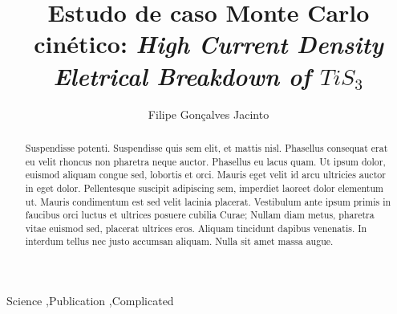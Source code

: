 \documentclass[12pt]{elsarticle}
\begin{document}
\begin{frontmatter}



    \title{Estudo de caso Monte Carlo cinético: \textit{High Current Density Eletrical Breakdown of $TiS_3$}}


\author{Filipe Gonçalves Jacinto}

\address{Vitória, Espírito Santo}

\begin{abstract}
Suspendisse potenti. Suspendisse quis sem elit, et mattis nisl. Phasellus consequat erat eu velit rhoncus non pharetra neque auctor. Phasellus eu lacus quam. Ut ipsum dolor, euismod aliquam congue sed, lobortis et orci. Mauris eget velit id arcu ultricies auctor in eget dolor. Pellentesque suscipit adipiscing sem, imperdiet laoreet dolor elementum ut. Mauris condimentum est sed velit lacinia placerat. Vestibulum ante ipsum primis in faucibus orci luctus et ultrices posuere cubilia Curae; Nullam diam metus, pharetra vitae euismod sed, placerat ultrices eros. Aliquam tincidunt dapibus venenatis. In interdum tellus nec justo accumsan aliquam. Nulla sit amet massa augue.
\end{abstract}

\begin{keyword}
Science \sep Publication \sep Complicated


\end{keyword}

\end{frontmatter}
\end{document}
